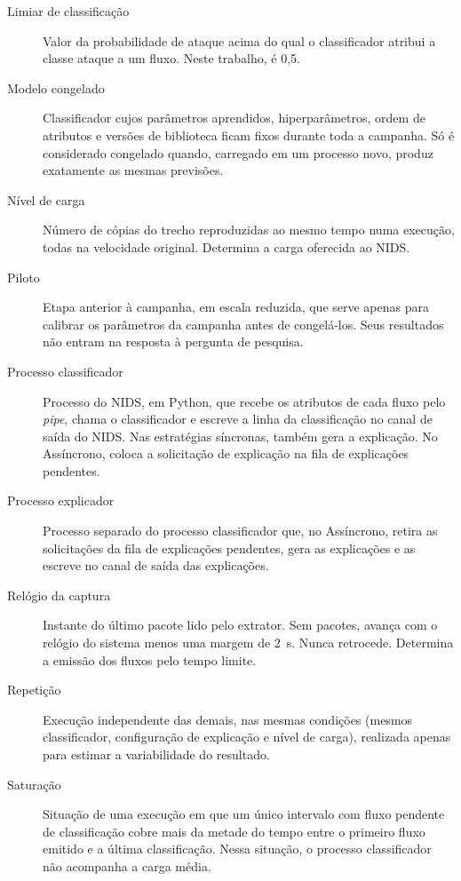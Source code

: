 \documentclass[
  12pt,
  oneside,
  a4paper,
  chapter=TITLE,
  sumario=tradicional,
  english,
  brazil
]{abntex2}
\begin{document}
\begin{description}
  \item[Limiar de classificação]\label{gl:limiar-classificacao} Valor da probabilidade de ataque acima do qual o classificador atribui a classe ataque a um fluxo. Neste trabalho, é 0,5.
  \item[Modelo congelado]\label{gl:modelo-congelado} Classificador cujos parâmetros aprendidos, hiperparâmetros, ordem de atributos e versões de biblioteca ficam fixos durante toda a campanha. Só é considerado congelado quando, carregado em um processo novo, produz exatamente as mesmas previsões.
  \item[Nível de carga]\label{gl:nivel-carga} Número de cópias do trecho reproduzidas ao mesmo tempo numa execução, todas na velocidade original. Determina a carga oferecida ao NIDS.
  \item[Piloto]\label{gl:piloto} Etapa anterior à campanha, em escala reduzida, que serve apenas para calibrar os parâmetros da campanha antes de congelá-los. Seus resultados não entram na resposta à pergunta de pesquisa.
  \item[Processo classificador]\label{gl:processo-classificador} Processo do NIDS, em Python, que recebe os atributos de cada fluxo pelo \emph{pipe}, chama o classificador e escreve a linha da classificação no canal de saída do NIDS. Nas estratégias síncronas, também gera a explicação. No Assíncrono, coloca a solicitação de explicação na fila de explicações pendentes.
  \item[Processo explicador]\label{gl:processo-explicador} Processo separado do processo classificador que, no Assíncrono, retira as solicitações da fila de explicações pendentes, gera as explicações e as escreve no canal de saída das explicações.
  \item[Relógio da captura]\label{gl:relogio} Instante do último pacote lido pelo extrator. Sem pacotes, avança com o relógio do sistema menos uma margem de 2~s. Nunca retrocede. Determina a emissão dos fluxos pelo tempo limite.
  \item[Repetição]\label{gl:repeticao} Execução independente das demais, nas mesmas condições (mesmos classificador, configuração de explicação e nível de carga), realizada apenas para estimar a variabilidade do resultado.
  \item[Saturação]\label{gl:saturacao} Situação de uma execução em que um único intervalo com fluxo pendente de classificação cobre mais da metade do tempo entre o primeiro fluxo emitido e a última classificação. Nessa situação, o processo classificador não acompanha a carga média.

\end{description}
\end{document}
